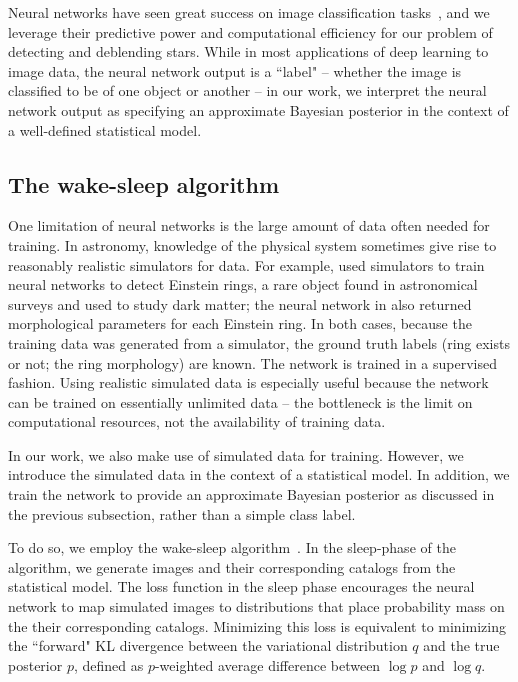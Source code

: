 Neural networks have seen great success on image classification tasks~\cite{imagenet2015}, and we leverage their predictive power and computational efficiency for our problem of detecting and deblending stars. While in most applications of deep learning to image data, the neural network output is a ``label" -- whether the image is classified to be of one object or another -- in our work, we interpret the neural network output as specifying an approximate Bayesian posterior in the context of a well-defined statistical model. 

\subsection{The wake-sleep algorithm}

One limitation of neural networks is the large amount of data often needed for training.
In astronomy, knowledge of the physical system sometimes give rise to reasonably realistic simulators for data. For example, \cite{Lanusse_2017_cmudeeplens} used simulators to train neural networks to detect Einstein rings, 
a rare object found in astronomical surveys and used to study dark matter; the neural network in \cite{Hezaveh_2017_nn_lensing_nature} also returned
morphological parameters for each Einstein ring. 
In both cases, because the training data was generated from a simulator, the ground truth labels (ring exists or not; the ring morphology) are known. The network is trained in a supervised fashion. Using realistic simulated data is especially useful because the network can be trained on essentially unlimited data -- the bottleneck is the limit on computational resources, not the availability of training data. 

In our work, we also make use of simulated data for training. However, we introduce the simulated data in the context of a statistical model. In addition, we train the network to provide an approximate Bayesian posterior as discussed in the previous subsection, rather than a simple class label. 

To do so, we employ the wake-sleep algorithm~\cite{Hinton1995wake_sleep}. 
In the sleep-phase of the algorithm, we generate images and their corresponding catalogs from the statistical model. The loss function 
in the sleep phase encourages the neural network
to map simulated images to distributions that place probability mass on the their corresponding catalogs.
Minimizing this loss is equivalent to minimizing the ``forward" KL divergence between the variational distribution $q$ and the true posterior $p$, defined as $p$-weighted average difference between $\log p$ and $\log q$. 

